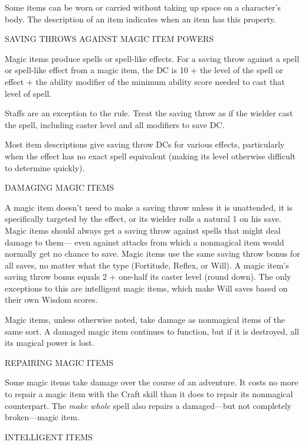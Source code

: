 Some items\textit{ }can be worn or carried without taking up space on a character's 
body. The description of an item indicates when an item has this property.

\vspace{12pt}
{\large SAVING THROWS AGAINST MAGIC ITEM POWERS}

Magic items produce spells or spell-like effects. For a saving throw against a 
spell or spell-like effect from a magic item, the DC is 10 + the level of the spell 
or effect + the ability modifier of the minimum ability score needed to cast that 
level of spell. 

Staffs are an exception to the rule. Treat the saving throw as if the wielder cast 
the spell, including caster level and all modifiers to save DC. 

Most item descriptions give saving throw DCs for various effects, particularly 
when the effect has no exact spell equivalent (making its level otherwise difficult 
to determine quickly).

\vspace{12pt}
{\large DAMAGING MAGIC ITEMS}

A magic item doesn't need to make a saving throw unless it is unattended, it is 
specifically targeted by the effect, or its wielder rolls a natural 1 on his save. 
Magic items should always get a saving throw against spells that might deal damage 
to them--- even against attacks from which a nonmagical item would normally get 
no chance to save. Magic items use the same saving throw bonus for all saves, no 
matter what the type (Fortitude, Reflex, or Will). A magic item's saving throw 
bonus equals 2 + one-half its caster level (round down). The only exceptions to 
this are intelligent magic items, which make Will saves based on their own Wisdom 
scores.

Magic items, unless otherwise noted, take damage as nonmagical items of the same 
sort. A damaged magic item continues to function, but if it is destroyed, all its 
magical power is lost.

\vspace{12pt}
{\large REPAIRING MAGIC ITEMS}

Some magic items take damage over the course of an adventure. It costs no more 
to repair a magic item with the Craft skill than it does to repair its nonmagical 
counterpart. The \textit{make whole }spell also repairs a damaged---but not completely 
broken---magic item.

\vspace{12pt}
{\large INTELLIGENT ITEMS}

